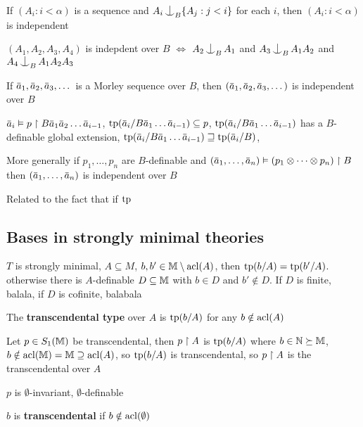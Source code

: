 \documentclass[11pt]{article}
\begin{document}
\begin{proposition}[]
If \((A_i:i<\alpha)\) is a sequence and \(A_i\ind_B\{A_j:j<i\}\) for each \(i\), then \((A_i:i<\alpha)\) is independent
\end{proposition}

\begin{examplle}[]
\((A_1,A_2,A_3,A_4)\) is indepdent over \(B\) \(\Leftrightarrow\) \(A_2\ind_BA_1\) and \(A_3\ind_BA_1A_2\) and \(A_4\ind_B{A_1A_2A_3}\)
\end{examplle}

\begin{examplle}[]
If \(\bara_1,\bara_2,\bara_3,\dots\) is a Morley sequence over \(B\), then \((\bara_1,\bara_2,\bara_3,\dots)\)
is independent over \(B\)

\(\bara_i\vDash p\uhr B\bara_1\bara_2\dots\bara_{i-1}\),
\(\tp(\bara_i/B\bara_1\dots\bara_{i-1})\subseteq p\), \(\tp(\bara_i/B\bara_1\dots\bara_{i-1})\) has
a \(B\)-definable global extension, \(\tp(\bara_i/B\bara_1\dots\bara_{i-1})\sqsupseteq\tp(\bara_i/B)\),

More generally if \(p_1,\dots,p_n\) are \(B\)-definable and \((\bara_1,\dots,\bara_n)\vDash(p_1\otimes\dots\otimes p_n)\uhr B\)
then \((\bara_1,\dots,\bara_n)\) is independent over \(B\)

Related to the fact that if \(\operatorname{tp}\)
\end{examplle}
\subsection{Bases in strongly minimal theories}
\label{sec:org5ddbd5d}
\(T\) is strongly minimal, \(A\subseteq M\), \(b,b'\in\mathbb{M}\setminus\operatorname{acl}(A)\), then \(\operatorname{tp}(b/A)=\operatorname{tp}(b'/A)\). otherwise
there is \(A\)-definable \(D\subseteq\mathbb{M}\) with \(b\in D\) and \(b'\notin D\). If \(D\) is finite, balala,
if \(D\) is cofinite, balabala

\begin{definition}[]
The \textbf{transcendental type} over \(A\) is \(\operatorname{tp}(b/A)\) for any \(b\notin\operatorname{acl}(A)\)
\end{definition}

Let \(p\in S_1(\mathbb{M})\) be transcendental, then \(p\upharpoonright A\) is \(\operatorname{tp}(b/A)\)
where \(b\in\mathbb{N}\succeq\mathbb{M}\), \(b\notin\operatorname{acl}(\mathbb{M})=\mathbb{M}\supseteq\operatorname{acl}(A)\), so \(\operatorname{tp}(b/A)\) is transcendental, so \(p\upharpoonright A\) is
the transcendental over \(A\)

\(p\) is \(\emptyset\)-invariant, \(\emptyset\)-definable

\begin{definition}[]
\(b\) is \textbf{transcendental} if \(b\notin\operatorname{acl}(\emptyset)\)
\end{definition}
\end{document}
